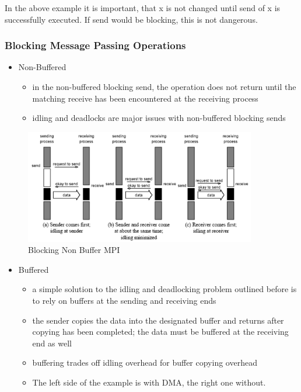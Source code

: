 In the above example it is important, that x is not changed until send
of x is successfully executed. If send would be blocking, this is not
dangerous.

\hypertarget{blocking-message-passing-operations}{%
\subsubsection{Blocking Message Passing
Operations}\label{blocking-message-passing-operations}}

\begin{itemize}
\tightlist
\item
  Non-Buffered

  \begin{itemize}
  \tightlist
  \item
    in the non-buffered blocking send, the operation does not return
    until the matching receive has been encountered at the receiving
    process
  \item
    idling and deadlocks are major issues with non-buffered blocking
    sends
  \end{itemize}
\end{itemize}

\begin{figure}[H]
\centering
\includegraphics[width=0.9\textwidth]{figures/BlockingNonBufferMPI.png}
\caption{Blocking Non Buffer MPI}
\end{figure}

\begin{itemize}
\tightlist
\item
  Buffered

  \begin{itemize}
  \tightlist
  \item
    a simple solution to the idling and deadlocking problem outlined
    before is to rely on buffers at the sending and receiving ends
  \item
    the sender copies the data into the designated buffer and returns
    after copying has been completed; the data must be buffered at the
    receiving end as well
  \item
    buffering trades off idling overhead for buffer copying overhead
  \item
    The left side of the example is with DMA, the right one without.
  \end{itemize}
\end{itemize}

